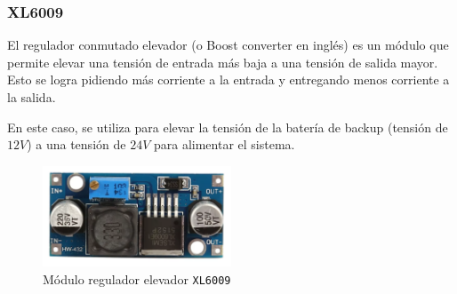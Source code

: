 \subsubsection{XL6009}

El regulador conmutado elevador (o Boost converter en inglés) es un módulo que permite elevar una tensión de entrada más baja a una tensión de salida mayor. Esto se logra pidiendo más corriente a la entrada y entregando menos corriente a la salida.

En este caso, se utiliza para elevar la tensión de la batería de backup (tensión de $12 V$) a una tensión de $24 V$ para alimentar el sistema.

\begin{figure}[h]
    \centering
    \includegraphics[width=0.5\textwidth]{images/2-hardware/componentes/XL6009.png}
    \caption{Módulo regulador elevador \texttt{XL6009}}
    \label{fig:hardware/modulos/xl6009}
\end{figure}
